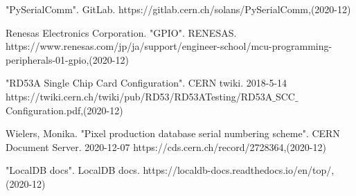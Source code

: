 \begin{thebibliography}{9}
"PySerialComm". GitLab. 
https://gitlab.cern.ch/solans/PySerialComm,(2020-12)

Renesas Electronics Corporation. "GPIO". RENESAS.  
https://www.renesas.com/jp/ja/support/engineer-school/mcu-programming-peripherals-01-gpio,(2020-12)

"RD53A Single Chip Card Configuration". CERN twiki. 2018-5-14 
https://twiki.cern.ch/twiki/pub/RD53/RD53ATesting/RD53A$\_$SCC$\_$Configuration.pdf,(2020-12)

Wielers, Monika. "Pixel production database serial numbering scheme". CERN Document Server. 2020-12-07
https://cds.cern.ch/record/2728364,(2020-12)

"LocalDB docs". LocalDB docs. 
https://localdb-docs.readthedocs.io/en/top/,(2020-12)

\end{thebibliography}
